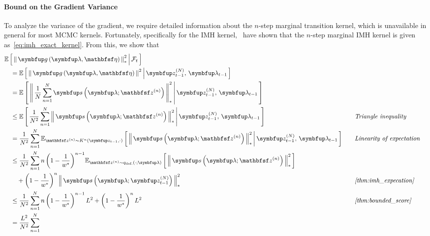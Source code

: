 \begin{proofEnd}
  \paragraph{\textbf{Bound on the Gradient Variance}}
  To analyze the variance of the gradient, we require detailed information about the \(n\)-step marginal transition kernel, which is unavailable in general for most MCMC kernels.
  Fortunately, specifically for the IMH kernel,~\citet{Smith96exacttransition} have shown that the \(n\)-step marginal IMH kernel is given as~\cref{eq:imh_exact_kernel}.
  From this, we show that
  \begin{alignat}{2}
    &\E{ \norm{ \vg\left(\vlambda, \rvveta\right) }^2_{*} \,\middle|\, \mathcal{F}_{t} }
    \nonumber
    \\
    &\quad=
    \E{ \norm{ \vg\left(\vlambda, \rvveta\right) }^2 \,\middle|\, \vz_{t-1}^{(N)},\, \vlambda_{t-1} }
    \nonumber
    \\
    &\quad=
    \E{ \norm{ \frac{1}{N}\sum^{N}_{n=1} \vs\left(\vlambda; \rvvz^{(n)}\right) }^2_{*} \,\middle|\, \vz_{t-1}^{(N)},\, \vlambda_{t-1} }
    \nonumber
    \\
    &\quad\leq
    \E{ \frac{1}{N^2} \sum^{N}_{n=1} \norm{\vs\left(\vlambda; \rvvz^{(n)}\right) }^2_{*} \,\middle|\, \vz_{t-1}^{(N)},\, \vlambda_{t-1} }
    &&\quad\text{\textit{Triangle inequality}}
    \nonumber
    \\
    &\quad=
    \frac{1}{N^2}\sum^{N}_{n=1} \Esub{\rvvz^{(n)} \sim K^n\left(\vz_{t-1}, \cdot\right)}{ \norm{\vs\left(\vlambda; \rvvz^{(n)}\right) }^2_{*} \,\middle|\,  \vz_{t-1}^{(N)},\, \vlambda_{t-1} }
    &&\quad\text{\textit{Linearity of expectation}}
    \nonumber
    \\
    &\quad\leq
    \frac{1}{N^2}\sum^{N}_{n=1}
      n \, {\left(1 - \frac{1}{w^*}\right)}^{n-1}
      \Esub{\rvvz^{(n)} \sim q_{\text{def.}}\left(\cdot; \vlambda\right)}{ \norm{\vs\left(\vlambda; \rvvz^{(n)} \right)}_{*}^2 }
      \nonumber
      \\
      &\qquad+ 
        {\left(1 - \frac{1}{w^*}\right)}^{n} \, \norm{\vs\left(\vlambda; \vz_{t-1}^{(N)} \right)}_{*}^2
    &&\quad\text{\textit{\cref{thm:imh_expecation}}}
    \nonumber
    \\
    &\quad\leq
    \frac{1}{N^2}\sum^{N}_{n=1}
      n \, {\left(1 - \frac{1}{w^*}\right)}^{n-1}  \, L^2
      +
      {\left(1 - \frac{1}{w^*}\right)}^{n} \, L^2
    &&\quad\text{\textit{\cref{thm:bounded_score}}}
    \nonumber
    \\
    &\quad=
    \frac{L^2}{N^2}\sum^{N}_{n=1}

\end{alignat}
\end{proofEnd}
